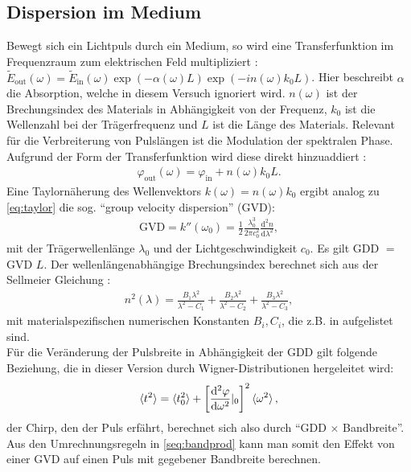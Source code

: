 \documentclass[twoside,        %
               BCOR12mm,       %
               english,ngerman, %
               fleqn,headsepline=false,footsepline=false
              ]{Vorlage/MFPREPORT}
\renewcommand{\d}{\ensuremath{\mathrm{d}}} %
\newcommand{\diff}[3][]{\ensuremath{\frac{\d^{#1}#2}{\d#3^{#1}}}} %
\begin{document}
\subsection{Dispersion im Medium}
Bewegt sich ein Lichtpuls durch ein Medium, so wird eine Transferfunktion im
Frequenzraum zum elektrischen Feld multipliziert \cite{trebinolec}: $\tilde
E_{\text{out}}(\omega)=\tilde{E}_{\text{in}}(\omega)\exp(-\alpha(\omega)L)\exp(-i
n(\omega)k_0L)$. Hier beschreibt $\alpha$ die Absorption, welche in diesem
Versuch ignoriert wird. $n(\omega)$ ist der Brechungsindex des Materials in
Abhängigkeit von der Frequenz, $k_0$ ist die Wellenzahl bei der Trägerfrequenz
und $L$ ist die Länge des Materials. Relevant für die Verbreiterung von
Pulslängen ist die Modulation der spektralen Phase. Aufgrund der Form der
Transferfunktion wird diese direkt hinzuaddiert \cite{trebinolec}:
\begin{align}
    \varphi_{\text{out}}(\omega)=\varphi_{\text{in}}+n(\omega)k_0L.
    \label{eq:transferphase}
\end{align}
Eine Taylornäherung des Wellenvektors $k(\omega)=n(\omega)k_0$ ergibt analog zu
\cref{eq:taylor} die sog. ``group velocity dispersion'' (GVD): \cite{trebinolec} 
\begin{align}
    \text{GVD}=k''(\omega_0)=\frac{1}{2}\frac{\lambda_0^3}{2\pi c_0^2}\diff[2]{n}{\lambda},
    \label{eq:gvd}
\end{align}
mit der Trägerwellenlänge $\lambda_0$ und der Lichtgeschwindigkeit $c_0$.
Es gilt GDD $=$ GVD $ L$.
Der wellenlängenabhängige Brechungsindex berechnet sich aus der Sellmeier
Gleichung \cite{refr}:
\begin{align}
    n^2(\lambda)=\frac{B_1 \lambda^2}{\lambda^2-C_1}+\frac{B_2 \lambda^2}{\lambda^2-C_2}+\frac{B_3 \lambda^2}{\lambda^2-C_3},
    \label{eq:sellmeier}
\end{align}
mit materialspezifischen numerischen Konstanten $B_i, C_i$, die z.B. in
\cite{refr} aufgelistet sind.\\
Für die Veränderung der Pulsbreite in Abhängigkeit der GDD gilt folgende
Beziehung, die in dieser Version durch Wigner-Distributionen \cite{Diels2006} 
hergeleitet wird:
\begin{align}
    \braket{t^2}=\braket{t_0^2}+\left[ \diff[2]{\varphi}{\omega}|_{0}
    \right]^2\braket{\omega^2},
    \label{eq:pulsverbreiterung}
\end{align}
der Chirp, den der Puls erfährt, berechnet sich also durch ``GDD $\times$
Bandbreite''. Aus den Umrechnungsregeln in \cref{seq:bandprod} kann man somit
den Effekt von einer GVD auf einen Puls mit gegebener
Bandbreite berechnen.
\end{document}
